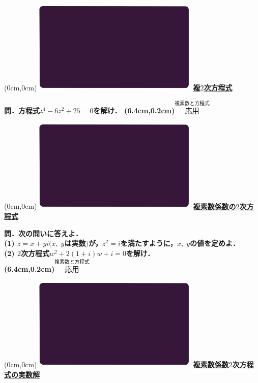 \documentclass[10pt,
fleqn,
dvipdfmx,
uplatex
]{jsarticle}
\begin{document}
\at(0cm,0cm){\includegraphics[width=8cm,bb=0 0 1920 1080]{./youtube/thumbnails/templates/smart_background/複素数と方程式.jpeg}}
{\color{orange}\bf\boldmath\huge\underline{複$2$次方程式}}\vspace{0.3zw}

\HUGE 
\bf\boldmath 問．方程式$z^4-6z^2+{25}=0$を解け．
\at(6.4cm,0.2cm){\small\color{bradorange}$\overset{\text{複素数と方程式}}{\text{応用}}$}


\newpage



\at(0cm,0cm){\includegraphics[width=8cm,bb=0 0 1920 1080]{./youtube/thumbnails/templates/smart_background/複素数と方程式.jpeg}}
{\color{orange}\bf\boldmath\LARGE\underline{複素数係数の$2$次方程式}}\vspace{0.3zw}

\large 
\bf\boldmath 問．次の問いに答えよ．\\
(1)  $z=x+yi(x,\;y$は実数$)$が，$z^2=i$を満たすように，$x,\;y$の値を定めよ．\\
(2)  $2$次方程式$w^2+2\left(1+i\right)w+i=0$を解け．\\

\at(6.4cm,0.2cm){\small\color{bradorange}$\overset{\text{複素数と方程式}}{\text{応用}}$}


\newpage



\at(0cm,0cm){\includegraphics[width=8cm,bb=0 0 1920 1080]{./youtube/thumbnails/templates/smart_background/複素数と方程式.jpeg}}
{\color{orange}\bf\boldmath\Large\underline{複素数係数$2$次方程式の実数解}}\vspace{0.3zw}
\end{document}
